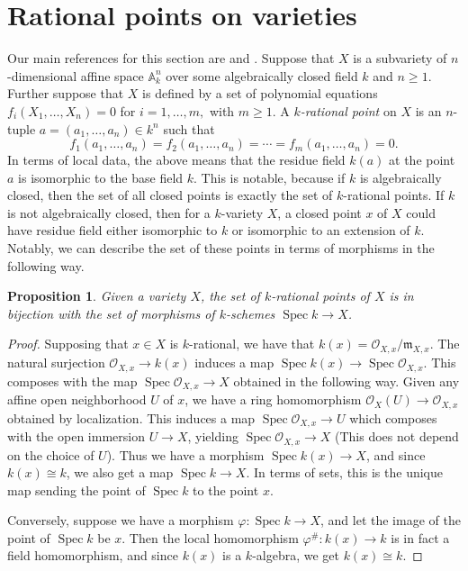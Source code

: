 \documentclass[12pt,twoside]{reedthesis}
\theoremstyle{plain}
\newtheorem{proposition}[theorem]{Proposition}
\theoremstyle{definition}
\theoremstyle{remark}
\newcommand{\Affine}{\mathbb{A}}
\newcommand{\calO}{\mathcal{O}}
\newcommand{\Spec}{\operatorname{Spec}}
\begin{document}
\section{Rational points on varieties}
Our main references for this section are \cite{qPoints} and \cite{qingLiu}. Suppose that $X$ is a subvariety of $n$-dimensional affine space $\Affine^n_k$ over some algebraically closed field $k$ and $n\geq1$. Further suppose that $X$ is defined by a set of polynomial equations $f_i(X_1,\ldots,X_n)=0$ for $i=1,\ldots,m,$ with $m\geq1.$  A \emph{$k$-rational point} on $X$ is an $n$-tuple $a=(a_1,\ldots,a_n)\in k^n$ such that \[f_1(a_1,\ldots,a_n)=f_2(a_1,\ldots,a_n)=\cdots=f_m(a_1,\ldots,a_n)=0.\] 
In terms of local data, the above means that the residue field $k(a)$ at the point $a$ is isomorphic to the base field $k$. This is notable, because if $k$ is algebraically closed, then the set of all closed points is exactly the set of $k$-rational points. If $k$ is not algebraically closed, then for a $k$-variety $X$, a closed point $x$ of $X$ could have residue field either isomorphic to $k$ or isomorphic to an extension of $k$. 
Notably, we can describe the set of these points in terms of morphisms in the following way.
\begin{proposition}
Given a variety $X$, the set of $k$-rational points of $X$ is in bijection with the set of morphisms of $k$-schemes $\Spec k\to X$.
\end{proposition}
\begin{proof}
Supposing that $x\in X$ is $k$-rational, we have that $k(x)=\calO_{X,x}/\mathfrak{m}_{X,x}$. The natural surjection $\calO_{X,x}\to k(x)$ induces a map $\Spec k(x)\to\Spec\calO_{X,x}$. This composes with the map $\Spec\calO_{X,x}\to X$ obtained in the following way. Given any affine open neighborhood $U$ of $x$, we have a ring homomorphism $\calO_X(U)\to\calO_{X,x}$ obtained by localization. This induces a map $\Spec\calO_{X,x}\to U$ which composes with the open immersion $U\to X$, yielding $\Spec\calO_{X,x}\to X$ (This does not depend on the choice of $U$). Thus we have a morphism $\Spec k(x)\to X$, and since $k(x)\cong k$, we also get a map $\Spec k\to X$. In terms of sets, this is the unique map sending the point of $\Spec k$ to the point $x$.

Conversely, suppose we have a morphism $\varphi:\Spec k\to X$, and let the image of the point of $\Spec k$ be $x$. Then the local homomorphism $\varphi^\#: k(x)\to k$ is in fact a field homomorphism, and since $k(x)$ is a $k$-algebra, we get $k(x)\cong k$.
\end{proof}
\end{document}
